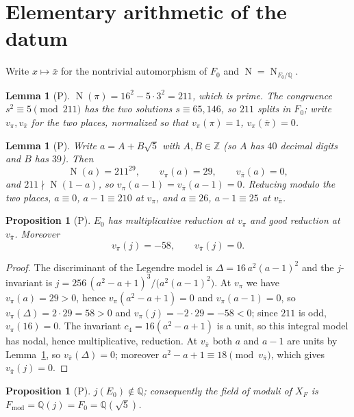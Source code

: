 \documentclass[11pt]{article}
\theoremstyle{plain}
\newtheorem{proposition}[theorem]{Proposition}
\newtheorem{lemma}[theorem]{Lemma}
\theoremstyle{definition}
\newcommand{\Fmod}{F_{\mathrm{mod}}}
\newcommand{\Norm}{\operatorname{N}}
\begin{document}
\section{Elementary arithmetic of the datum}\label{sec:arith}

Write $x\mapsto\bar x$ for the nontrivial automorphism of $F_0$ and
$\Norm=\Norm_{F_0/\mathbb{Q}}$.

\begin{lemma}[P]\label{lem:split}
$\Norm(\pi)=16^2-5\cdot3^2=211$, which is prime.  The congruence $s^2\equiv5
\pmod{211}$ has the two solutions $s\equiv65,146$, so $211$ splits in $F_0$;
write $v_\pi,v_{\bar\pi}$ for the two places, normalized so that
$v_\pi(\pi)=1$, $v_\pi(\bar\pi)=0$.
\end{lemma}

\begin{lemma}[P]\label{lem:val}
Write $a=A+B\sqrt5$ with $A,B\in\mathbb{Z}$ (so $A$ has $40$ decimal digits and
$B$ has $39$).  Then
\[
  \Norm(a)=211^{29},\qquad v_\pi(a)=29,\qquad v_{\bar\pi}(a)=0,
\]
and $211\nmid\Norm(1-a)$, so $v_\pi(a-1)=v_{\bar\pi}(a-1)=0$.
Reducing modulo the two places, $a\equiv0$, $a-1\equiv210$ at $v_\pi$, and
$a\equiv26$, $a-1\equiv25$ at $v_{\bar\pi}$.
\end{lemma}

\begin{proposition}[P]\label{prop:red}
$E_0$ has multiplicative reduction at $v_\pi$ and good reduction at
$v_{\bar\pi}$.  Moreover
\[
 v_\pi(j)=-58,\qquad v_{\bar\pi}(j)=0 .
\]
\end{proposition}

\begin{proof}
The discriminant of the Legendre model is $\Delta=16\,a^2(a-1)^2$ and the
$j$-invariant is $j=256\,(a^2-a+1)^3/\bigl(a^2(a-1)^2\bigr)$.  At $v_\pi$ we have
$v_\pi(a)=29>0$, hence $v_\pi(a^2-a+1)=0$ and $v_\pi(a-1)=0$, so
$v_\pi(\Delta)=2\cdot29=58>0$ and $v_\pi(j)=-2\cdot29=-58<0$; since $211$ is odd,
$v_\pi(16)=0$.  The invariant $c_4=16(a^2-a+1)$ is a unit, so this
integral model has nodal, hence multiplicative, reduction.  At $v_{\bar\pi}$
both $a$ and $a-1$ are units by Lemma~\ref{lem:val}, so
$v_{\bar\pi}(\Delta)=0$; moreover $a^2-a+1\equiv18\pmod{v_{\bar\pi}}$,
which gives $v_{\bar\pi}(j)=0$.
\end{proof}

\begin{proposition}[P]\label{prop:fmod}
$j(E_0)\notin\mathbb{Q}$; consequently the field of moduli of $X_F$ is
$\Fmod=\mathbb{Q}(j)=F_0=\mathbb{Q}(\sqrt5)$.
\end{proposition}
\end{document}
